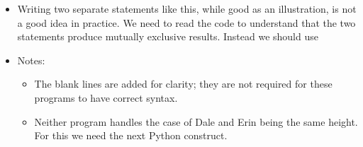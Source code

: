 \documentclass[letterpaper,10pt,english]{sphinxmanual}
\begin{document}
\begin{itemize}
\item {} 
Writing two separate  statements like this, while good as an
illustration, is not a good idea in practice.  We need to read the
code to understand that the two  statements produce mutually
exclusive results.  Instead we should use 

%
\begin{sphinxVerbatim}[commandchars=\\\{\}]
  
      

  
      

   
     
      
     
      

 
\end{sphinxVerbatim}

\item {} 
Notes:
\begin{itemize}
\item {} 
The blank lines are added for clarity; they are not required
for these programs to have correct syntax.

\item {} 
Neither program handles the case of Dale and Erin being the same
height. For this we need the next Python construct.

\end{itemize}

\end{itemize}
\end{document}

